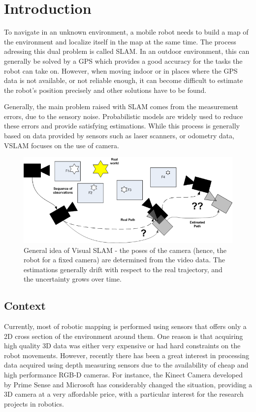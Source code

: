 \chapter{Introduction}

To navigate in an unknown environment, a mobile robot needs to build a map of the environment and localize itself in the map at the same time. The process adressing this dual problem is called \gls{SLAM}. In an outdoor environment, this can generally be solved by a GPS which provides a good accuracy for the tasks the robot can take on. However, when moving indoor or in places where the GPS data is not available, or not reliable enough, it can become difficult to estimate the robot's position precisely and other solutions have to be found. 

Generally, the main problem raised with \gls{SLAM} comes from the measurement errors, due to the sensory noise. Probabilistic models are widely used to reduce these errors and provide satisfying estimations. While this process is generally based on data provided by sensors such as laser scanners, or odometry data, \gls{VSLAM} focuses on the use of camera.

\begin{figure}[h!]
\begin{center}
\includegraphics[width=1.0\textwidth]{figures/visual_slam}
\caption{General idea of Visual SLAM - the poses of the camera (hence, the robot for a fixed camera) are determined from the video data. The estimations generally drift with respect to the real trajectory, and the uncertainty grows over time.}
\end{center}
\label{fig:vslam_overview}
\end{figure}

\section{Context}

Currently, most of robotic mapping is performed using sensors that offers only a 2D cross section of the environment around them. One reason is that acquiring high quality 3D data was either very expensive or had hard constraints on the robot movements. However, recently there has been a great interest in processing data acquired using depth measuring sensors due to the availability of cheap and high performance RGB-D cameras. For instance, the Kinect Camera developed by Prime Sense and Microsoft has considerably changed the situation, providing a 3D camera at a very affordable price, with a particular interest for the research projects in robotics.

